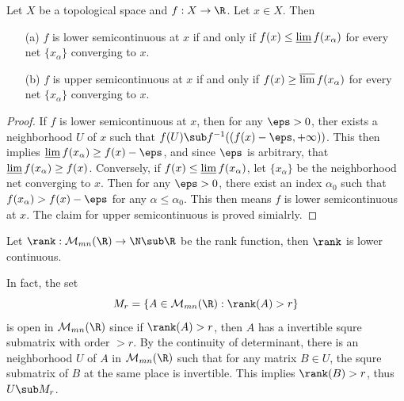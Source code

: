 \begin{proposition}\label{semicontinuous via liminf and limsup}
Let $X$ be a topological space and $f:X\to\R$. Let $x\in X$. Then
\begin{itemize}
\item[(a)] $f$ is lower semicontinuous at $x$ if and only if $f(x)\leq\varliminf f(x_\alpha)$ for every net $\{x_\alpha\}$ converging to $x$.
\item[(b)] $f$ is upper semicontinuous at $x$ if and only if $f(x)\geq\varlimsup f(x_\alpha)$ for every net $\{x_\alpha\}$ converging to $x$.
\end{itemize}
\end{proposition}
\begin{proof}
If $f$ is lower semicontinuous at $x$, then for any $\eps>0$, ther exists a neighborhood $U$ of $x$ such that $f(U)\sub f^{-1}((f(x)-\eps,+\infty))$. This then implies $\varliminf f(x_\alpha)\geq f(x)-\eps$, and since $\eps$ is arbitrary, that $\varliminf f(x_\alpha)\geq f(x)$. Conversely, if $f(x)\leq\varliminf f(x_\alpha)$, let $\{x_\alpha\}$ be the neighborhood net converging to $x$. Then for any $\eps>0$, there exist an index $\alpha_0$ such that $f(x_\alpha)>f(x)-\eps$ for any $\alpha\leq\alpha_0$. This then means $f$ is lower semicontinuous at $x$. The claim for upper semicontinuous is proved simialrly.
\end{proof}
\begin{example}\label{rank function}
Let $\rank:\mathcal{M}_{mn}(\R)\to\N\sub\R$ be the rank function, then $\rank$ is lower continuous.\par
In fact, the set
\[M_r=\{A\in\mathcal{M}_{mn}(\R):\rank(A)>r\}\]
is open in $\mathcal{M}_{mn}(\R)$ since if $\rank(A)>r$, then $A$ has a invertible squre submatrix with order $>r$. By the continuity of determinant, there is an neighborhood $U$ of $A$ in $\mathcal{M}_{mn}(\R)$ such that for any matrix $B\in U$, the squre submatrix of $B$ at the same place is invertible. This implies $\rank(B)>r$, thus $U\sub M_r$.
\end{example}

